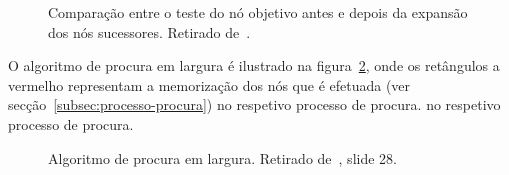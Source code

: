 \begin{figure}[H]
    \begin{center}
    \end{center}
    \caption{Comparação entre o teste do nó objetivo antes e depois da expansão dos nós sucessores.
    Retirado de~\cite{ist:leic:resumos:procura-cega}.}
    \label{fig:alg-proc-largura-teste}
\end{figure}

O algoritmo de procura em largura é ilustrado na figura~\ref{fig:alg-proc-largura}, onde os retângulos a vermelho representam a memorização dos nós que é efetuada (ver secção~\ref{subsec:processo-procura}) no respetivo processo de procura. no respetivo processo de procura.

\begin{figure}[H]
    \begin{center}
    \end{center}
    \caption{Algoritmo de procura em largura. Retirado de~\cite{isel:iasa:slides:proc-espaco-estados-parte-1}, slide 28.}
    \label{fig:alg-proc-largura}
\end{figure}

